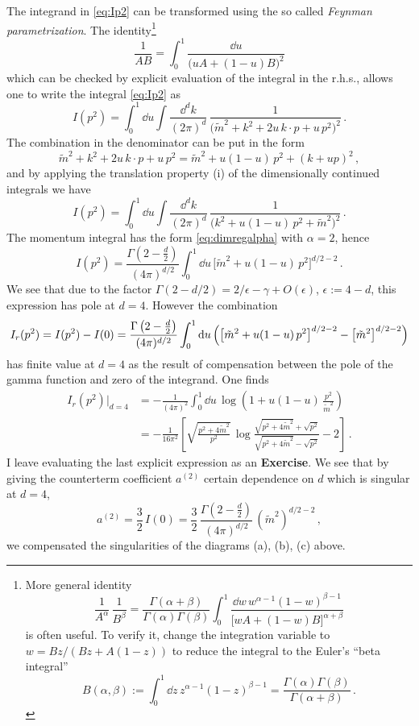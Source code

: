 The integrand in \eqref{eq:Ip2} can be transformed using the so called
\emph{Feynman parametrization}. The identity\footnote{More general identity
\begin{equation}\label{eq:FeynParGen}
\frac1{A^\alpha}\,\frac1{B^\beta}=\frac{\Gamma(\alpha+\beta)}{\Gamma(\alpha)\Gamma(\beta)}\int_0^1\frac{\dd w\,w^{\alpha-1}(1-w)^{\beta-1}}{\bigl[wA+(1-w)B\bigr]^{\alpha+\beta}}
\end{equation}
is often useful. To verify it, change the integration variable to
$w=Bz/(Bz+A(1-z))$ to reduce the integral to the Euler's ``beta integral''
\[
B(\alpha,\beta):=\int_0^1\dd z\,z^{\alpha-1}(1-z)^{\beta-1}=\frac{\Gamma(\alpha)\Gamma(\beta)}{\Gamma(\alpha+\beta)}\,.
\]}
\[
\frac1{AB}=\int_0^1\frac{\dd u}{\bigl(uA+(1-u)B\bigr)^2}
\]
which can be checked by explicit evaluation of the integral in the r.h.s.,
allows one to write the integral \eqref{eq:Ip2} as
\begin{equation}\label{eq:IFeyn}
I(p^2)=\int_0^1\dd u\int\frac{\dd^dk}{(2\pi)^d}\,\frac1{\bigl(\tilde m^2+k^2+2u\,k\cdot p+u\,p^2\bigr)^2}\,.
\end{equation}
The combination in the denominator can be put in the form
\[
\tilde m^2+k^2+2u\,k\cdot p+u\,p^2=\tilde m^2+u(1-u)\,p^2+(k+up)^2\,,
\]
and by applying the translation property (i) of the dimensionally continued
integrals we have
\[
I(p^2)=\int_0^1\dd u\int\frac{\dd^dk}{(2\pi)^d}\,\frac1{\bigl(k^2+u(1-u)\,p^2+\tilde m^2\bigr)^2}\,.
\]
The momentum integral has the form \eqref{eq:dimregalpha} with $\alpha=2$, hence
\[
I(p^2)=\frac{\Gamma\left(2-\frac d2\right)}{(4\pi)^{d/2}}\int_0^1\dd u\,\bigl[\tilde m^2+u(1-u)\,p^2\bigr]^{d/2-2}\,.
\]
We see that due to the factor $\Gamma(2-d/2)=2/\epsilon-\gamma+O(\epsilon)$,
$\epsilon:=4-d$, this expression has pole at $d=4$. However the combination
\[
I_r(p^2)=I(p^2)-I(0)=\frac{\Gamma\left(2-\frac d2\right)}{(4\pi)^{d/2}}\int_0^1\mathop{}\!\mathrm{d} u\,\Bigl(\bigl[\tilde m^2+u(1-u)\,p^2\bigr]^{d/2-2}-\bigl[\tilde m^2\bigr]^{d/2-2}\Bigr)
\]
has finite value at $d=4$ as the result of compensation between the pole of the
gamma function and zero of the integrand. One finds
\begin{align*}
I_r(p^2)\Big|_{d=4}&=-\frac1{(4\pi)^2}\int_0^1\dd u\,\log\left(1+u(1-u)\,\frac{p^2}{\tilde m^2}\right)\\
&=-\frac1{16\pi^2}\left[\sqrt{\frac{p^2+4\tilde m^2}{p^2}}\,\log\frac{\sqrt{p^2+4\tilde m^2}+\sqrt{p^2}}{\sqrt{p^2+4\tilde m^2}-\sqrt{p^2}}-2\right]\,.
\end{align*}
I leave evaluating the last explicit expression as an \textbf{Exercise}. We see
that by giving the counterterm coefficient $a^{(2)}$ certain dependence on $d$
which is singular at $d=4$,
\begin{equation}\label{eq:a2}
a^{(2)}=\frac32\,I(0)=\frac32\,\frac{\Gamma\left(2-\frac d2\right)}{(4\pi)^{d/2}}\,(\tilde m^2)^{d/2-2}\,,
\end{equation}
we compensated the singularities of the diagrams (a), (b), (c) above.

